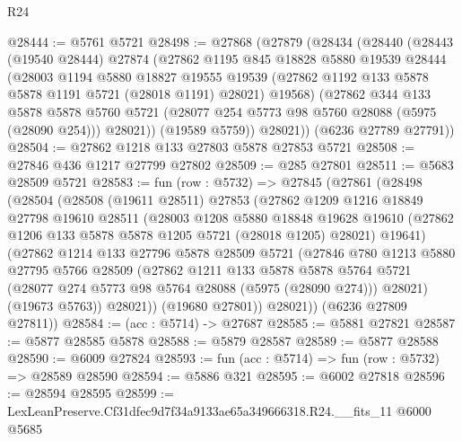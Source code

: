 \begin{lexlean}{R24}
\begin{coremodule}
@28444 := @5761 @5721
@28498 := @27868
    (@27879
      (@28434
        (@28440
          (@28443
            (@19540 @28444)
            @27874
            (@27862
              @1195
              @845
              @18828
              @5880
              @19539
              @28444
              (@28003
                @1194
                @5880
                @18827
                @19555
                @19539
                (@27862 @1192 @133 @5878 @5878 @1191 @5721 (@28018 @1191) @28021)
                @19568)
              (@27862
                @344
                @133
                @5878
                @5878
                @5760
                @5721
                (@28077 @254 @5773 @98 @5760 @28088 (@5975 (@28090 @254)))
                @28021))
            (@19589 @5759))
          @28021))
      (@6236 @27789 @27791))
@28504 := @27862 @1218 @133 @27803 @5878 @27853 @5721
@28508 := @27846 @436 @1217 @27799 @27802
@28509 := @285 @27801
@28511 := @5683 @28509 @5721
@28583 := fun (row : @5732) =>
  @27845
    (@27861
      (@28498
        (@28504
          (@28508
            (@19611 @28511)
            @27853
            (@27862
              @1209
              @1216
              @18849
              @27798
              @19610
              @28511
              (@28003
                @1208
                @5880
                @18848
                @19628
                @19610
                (@27862 @1206 @133 @5878 @5878 @1205 @5721 (@28018 @1205) @28021)
                @19641)
              (@27862
                @1214
                @133
                @27796
                @5878
                @28509
                @5721
                (@27846
                  @780
                  @1213
                  @5880
                  @27795
                  @5766
                  @28509
                  (@27862
                    @1211
                    @133
                    @5878
                    @5878
                    @5764
                    @5721
                    (@28077 @274 @5773 @98 @5764 @28088 (@5975 (@28090 @274)))
                    @28021)
                  (@19673 @5763))
                @28021))
            (@19680 @27801))
          @28021))
      (@6236 @27809 @27811))
@28584 := (acc : @5714) -> @27687
@28585 := @5881 @27821
@28587 := @5877 @28585 @5878
@28588 := @5879 @28587
@28589 := @5877 @28588
@28590 := @6009 @27824
@28593 := fun (acc : @5714) => fun (row : @5732) => @28589 @28590
@28594 := @5886 @321
@28595 := @6002 @27818
@28596 := @28594 @28595
@28599 := LexLeanPreserve.Cf31dfec9d7f34a9133ae65a349666318.R24.__fits_11 @6000 @5685

\end{coremodule}
\end{lexlean}
